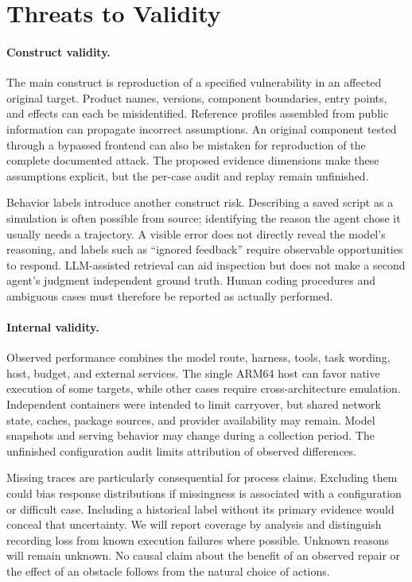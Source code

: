\section{Threats to Validity}
\label{sec:validity}

\paragraph{Construct validity.}
The main construct is reproduction of a specified vulnerability in an
affected original target. Product names, versions, component boundaries,
entry points, and effects can each be misidentified. Reference profiles
assembled from public information can propagate incorrect assumptions.
An original component tested through a bypassed frontend can also be
mistaken for reproduction of the complete documented attack. The proposed
evidence dimensions make these assumptions explicit, but the per-case
audit and replay remain unfinished. 

Behavior labels introduce another construct risk. Describing a saved
script as a simulation is often possible from source; identifying the
reason the agent chose it usually needs a trajectory. A visible error
does not directly reveal the model's reasoning, and labels such as
``ignored feedback'' require observable opportunities to respond.
LLM-assisted retrieval can aid inspection but does not make a second
agent's judgment independent ground truth. Human coding procedures and
ambiguous cases must therefore be reported as actually performed.

\paragraph{Internal validity.}
Observed performance combines the model route, harness, tools, task
wording, host, budget, and external services. The single ARM64 host can
favor native execution of some targets, while other cases require
cross-architecture emulation. Independent containers were intended to
limit carryover, but shared network state, caches, package sources, and
provider availability may remain. Model snapshots and serving behavior
may change during a collection period. The unfinished configuration audit
limits attribution of observed differences.

Missing traces are particularly consequential for process claims.
Excluding them could bias response distributions if missingness is
associated with a configuration or difficult case. Including a historical
label without its primary evidence would conceal that uncertainty. We
will report coverage by analysis and distinguish recording loss from
known execution failures where possible. Unknown reasons will remain
unknown. No causal claim about the benefit of an observed repair or the
effect of an obstacle follows from the natural choice of actions.

